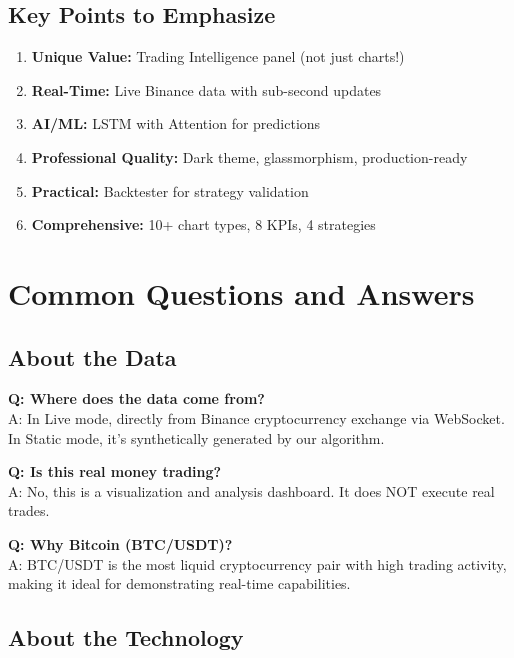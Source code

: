 \documentclass[12pt,a4paper]{article}
\begin{document}
\subsection{Key Points to Emphasize}

\begin{enumerate}
    \item \textbf{Unique Value:} Trading Intelligence panel (not just charts!)
    \item \textbf{Real-Time:} Live Binance data with sub-second updates
    \item \textbf{AI/ML:} LSTM with Attention for predictions
    \item \textbf{Professional Quality:} Dark theme, glassmorphism, production-ready
    \item \textbf{Practical:} Backtester for strategy validation
    \item \textbf{Comprehensive:} 10+ chart types, 8 KPIs, 4 strategies
\end{enumerate}

\section{Common Questions and Answers}

\subsection{About the Data}

\textbf{Q: Where does the data come from?}\\
A: In Live mode, directly from Binance cryptocurrency exchange via WebSocket. In Static mode, it's synthetically generated by our algorithm.

\textbf{Q: Is this real money trading?}\\
A: No, this is a visualization and analysis dashboard. It does NOT execute real trades.

\textbf{Q: Why Bitcoin (BTC/USDT)?}\\
A: BTC/USDT is the most liquid cryptocurrency pair with high trading activity, making it ideal for demonstrating real-time capabilities.

\subsection{About the Technology}
\end{document}
